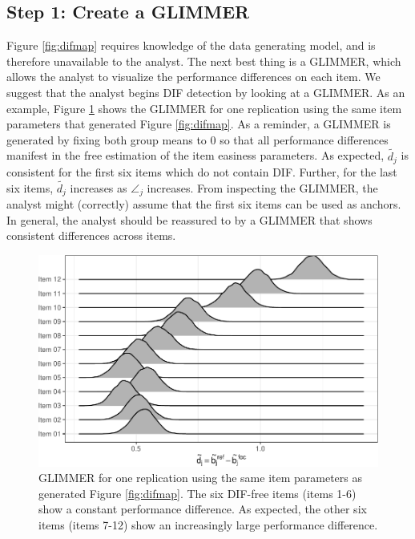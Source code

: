 \documentclass[
  english,
  man,floatsintext]{apa6}
\begin{document}
\hypertarget{step-1-create-a-glimmer}{%
\subsection{Step 1: Create a GLIMMER}\label{step-1-create-a-glimmer}}

Figure \ref{fig:difmap} requires knowledge of the data generating model, and is therefore unavailable to the analyst. The next best thing is a GLIMMER, which allows the analyst to visualize the performance differences on each item. We suggest that the analyst begins DIF detection by looking at a GLIMMER. As an example, Figure \ref{fig:simemmlg} shows the GLIMMER for one replication using the same item parameters that generated Figure \ref{fig:difmap}. As a reminder, a GLIMMER is generated by fixing both group means to 0 so that all performance differences manifest in the free estimation of the item easiness parameters. As expected, \(\tilde{d_j}\) is consistent for the first six items which do not contain DIF. Further, for the last six items, \(\tilde{d_j}\) increases as \(\angle_j\) increases. From inspecting the GLIMMER, the analyst might (correctly) assume that the first six items can be used as anchors. In general, the analyst should be reassured to by a GLIMMER that shows consistent differences across items.

\begin{figure}[h]

{\centering \includegraphics[width=0.7\linewidth]{paper_apa_files/figure-latex/simemmlg-1}

}

\caption{GLIMMER for one replication using the same item parameters as generated Figure \ref{fig:difmap}. The six DIF-free items (items 1-6) show a constant performance difference. As expected, the other six items (items 7-12) show an increasingly large performance difference.}\label{fig:simemmlg}
\end{figure}
\end{document}
